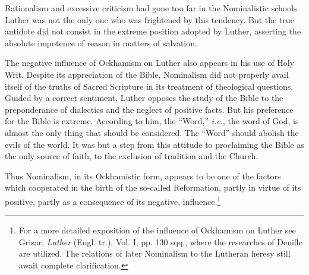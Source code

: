 Rationalism and excessive criticism had gone too far in the Nominalistic
schools. Luther was not the only one who was frightened by this tendency.
But the true antidote did not consist in the extreme position adopted by
Luther, asserting the absolute impotence of reason in matters of salvation.

The negative influence of Ockhamism on Luther also appears in his use
of Holy Writ. Despite its appreciation of the Bible, Nominalism did not
properly avail itself of the truths of Sacred Scripture in its treatment of
theological questions. Guided by a correct sentiment, Luther opposes the
study of the Bible to the preponderance of dialectics and the neglect of
positive facts. But his preference for the Bible is extreme. According to him,
the “Word,” \textit{i.e.}, the word of God, is almost the only thing that should be
considered. The “Word” should abolish the evils of the world. It was but
a step from this attitude to proclaiming the Bible as the only source of
faith, to the exclusion of tradition and the Church.

Thus Nominalism, in its Ockhamistic form, appears to be one of the
factors which cooperated in the birth of the so-called Reformation,
partly in virtue of its positive, partly as a consequence of its negative, influence.\footnote
{For a more detailed exposition of the influence of Ockhamism on Luther see Grisar,
\textit{Luther} (Engl. tr.), Vol. I, pp. 130 sqq., where the researches of Denifle are utilized. The
relations of later Nominalism to the Lutheran heresy still await complete clarification.}
